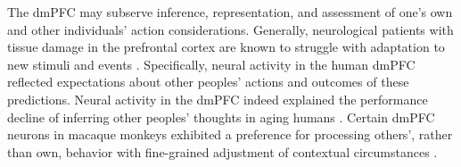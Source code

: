 \documentclass[10pt,letterpaper]{article}
\begin{document}
The dmPFC may subserve inference, representation, and assessment
of one's own and other individuals' action considerations.
Generally,
neurological patients with tissue damage in the prefrontal cortex
are known to struggle with
adaptation to new stimuli and events
\citep{stuss1986frontal}.
Specifically, neural activity in the human dmPFC
reflected expectations about other peoples' actions and
outcomes of these predictions.
Neural activity in the dmPFC indeed explained the performance decline
of inferring other peoples' thoughts in aging humans \citep{moran2012social}.
Certain dmPFC neurons in macaque monkeys exhibited a preference
for processing others', rather than own, behavior
with fine-grained adjustment of contextual circumstances \citep{yoshida2010neural}.
%
\end{document}
